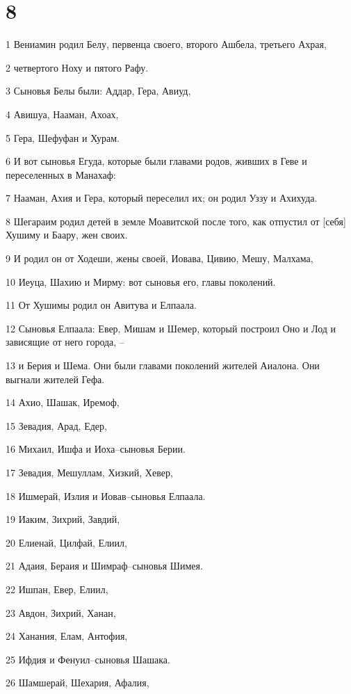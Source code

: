 \chapter{8}

\par 1 Вениамин родил Белу, первенца своего, второго Ашбела, третьего Ахрая,
\par 2 четвертого Ноху и пятого Рафу.
\par 3 Сыновья Белы были: Аддар, Гера, Авиуд,
\par 4 Авишуа, Нааман, Ахоах,
\par 5 Гера, Шефуфан и Хурам.
\par 6 И вот сыновья Егуда, которые были главами родов, живших в Геве и переселенных в Манахаф:
\par 7 Нааман, Ахия и Гера, который переселил их; он родил Уззу и Ахихуда.
\par 8 Шегараим родил детей в земле Моавитской после того, как отпустил от [себя] Хушиму и Баару, жен своих.
\par 9 И родил он от Ходеши, жены своей, Иовава, Цивию, Мешу, Малхама,
\par 10 Иеуца, Шахию и Мирму: вот сыновья его, главы поколений.
\par 11 От Хушимы родил он Авитува и Елпаала.
\par 12 Сыновья Елпаала: Евер, Мишам и Шемер, который построил Оно и Лод и зависящие от него города, --
\par 13 и Берия и Шема. Они были главами поколений жителей Аиалона. Они выгнали жителей Гефа.
\par 14 Ахио, Шашак, Иремоф,
\par 15 Зевадия, Арад, Едер,
\par 16 Михаил, Ишфа и Иоха--сыновья Берии.
\par 17 Зевадия, Мешуллам, Хизкий, Хевер,
\par 18 Ишмерай, Излия и Иовав--сыновья Елпаала.
\par 19 Иаким, Зихрий, Завдий,
\par 20 Елиенай, Цилфай, Елиил,
\par 21 Адаия, Бераия и Шимраф--сыновья Шимея.
\par 22 Ишпан, Евер, Елиил,
\par 23 Авдон, Зихрий, Ханан,
\par 24 Ханания, Елам, Антофия,
\par 25 Ифдия и Фенуил--сыновья Шашака.
\par 26 Шамшерай, Шехария, Афалия,
